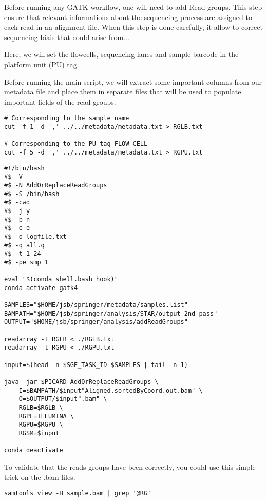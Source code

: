 Before running any GATK workflow, one will need to add Read groups. This step ensure that relevant informations about the sequencing process are assigned to each read in an alignment file. When this step is done carefully, it allow to correct sequencing biais that could arise from...


Here, we will set the flowcells, sequencing lanes and sample barcode in the platform unit (PU) tag.

Before running the main script, we will extract some important columns from our metadata file and place them in separate files that will be used to populate important fields of the read groups.

\begin{verbatim}
# Corresponding to the sample name
cut -f 1 -d ',' ../../metadata/metadata.txt > RGLB.txt
 
# Corresponding to the PU tag FLOW CELL 
cut -f 5 -d ',' ../../metadata/metadata.txt > RGPU.txt
\end{verbatim}





\begin{verbatim}
#!/bin/bash
#$ -V
#$ -N AddOrReplaceReadGroups
#$ -S /bin/bash
#$ -cwd
#$ -j y
#$ -b n
#$ -e e
#$ -o logfile.txt
#$ -q all.q
#$ -t 1-24
#$ -pe smp 1

eval "$(conda shell.bash hook)"
conda activate gatk4	

SAMPLES="$HOME/jsb/springer/metadata/samples.list"
BAMPATH="$HOME/jsb/springer/analysis/STAR/output_2nd_pass"
OUTPUT="$HOME/jsb/springer/analysis/addReadGroups"	

readarray -t RGLB < ./RGLB.txt
readarray -t RGPU < ./RGPU.txt

input=$(head -n $SGE_TASK_ID $SAMPLES | tail -n 1)	

java -jar $PICARD AddOrReplaceReadGroups \
	I=$BAMPATH/$input"Aligned.sortedByCoord.out.bam" \
	O=$OUTPUT/$input".bam" \
	RGLB=$RGLB \
	RGPL=ILLUMINA \
	RGPU=$RGPU \
	RGSM=$input
	
conda deactivate
\end{verbatim}


To validate that the reads groups have been correctly, you could use this simple trick on the .bam files:

\begin{verbatim}
samtools view -H sample.bam | grep '@RG' 
\end{verbatim}







